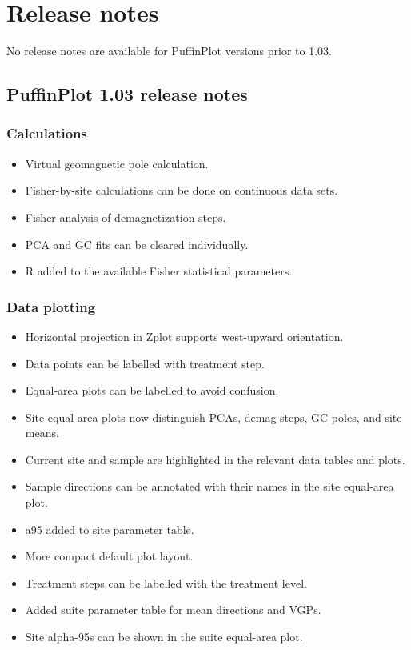 \documentclass[a4paper,british]{article}
\begin{document}
\clearpage

\section{Release notes}

No release notes are available for PuffinPlot versions prior to 1.03.

\subsection*{PuffinPlot 1.03 release notes}
\label{sec-1}
\subsubsection*{Calculations}
\label{sec-1-1}
\begin{itemize}
\item Virtual geomagnetic pole calculation.
\item Fisher-by-site calculations can be done on continuous data sets.
\item Fisher analysis of demagnetization steps.
\item PCA and GC fits can be cleared individually.
\item R added to the available Fisher statistical parameters.
\end{itemize}

\subsubsection*{Data plotting}
\label{sec-1-2}
\begin{itemize}
\item Horizontal projection in Zplot supports west-upward orientation.
\item Data points can be labelled with treatment step.
\item Equal-area plots can be labelled to avoid confusion.
\item Site equal-area plots now distinguish PCAs, demag steps, GC poles,
and site means.
\item Current site and sample are highlighted in the relevant data tables
and plots.
\item Sample directions can be annotated with their names in the site
equal-area plot.
\item a95 added to site parameter table.
\item More compact default plot layout.
\item Treatment steps can be labelled with the treatment level.
\item Added suite parameter table for mean directions and VGPs.
\item Site alpha-95s can be shown in the suite equal-area plot.
\end{itemize}
\end{document}
